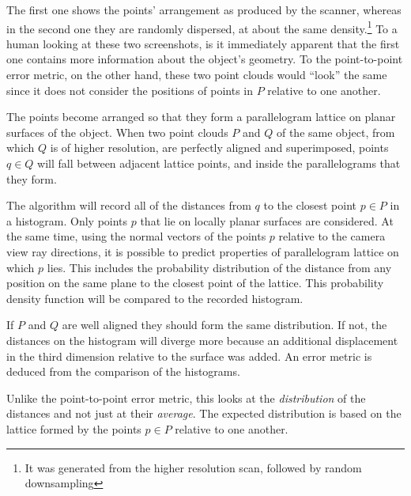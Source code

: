 The first one shows the points' arrangement as produced by the scanner, whereas in the second one they are randomly dispersed, at about the same density.\footnote{It was generated from the higher resolution scan, followed by random downsampling} To a human looking at these two screenshots, is it immediately apparent that the first one contains more information about the object's geometry. To the point-to-point error metric, on the other hand, these two point clouds would ``look'' the same since it does not consider the positions of points in $P$ relative to one another.

The points become arranged so that they form a parallelogram lattice on planar surfaces of the object. When two point clouds $P$ and $Q$ of the same object, from which $Q$ is of higher resolution, are perfectly aligned and superimposed, points $q \in Q$ will fall between adjacent lattice points, and inside the parallelograms that they form.

The algorithm will record all of the distances from $q$ to the closest point $p \in P$ in a histogram. Only points $p$ that lie on locally planar surfaces are considered. At the same time, using the normal vectors of the points $p$ relative to the camera view ray directions, it is possible to predict properties of parallelogram lattice on which $p$ lies. This includes the probability distribution of the distance from any position on the same plane to the closest point of the lattice. This probability density function will be compared to the recorded histogram.

If $P$ and $Q$ are well aligned they should form the same distribution. If not, the distances on the histogram will diverge more because an additional displacement in the third dimension relative to the surface was added. An error metric is deduced from the comparison of the histograms.

Unlike the point-to-point error metric, this looks at the \emph{distribution} of the distances and not just at their \emph{average}. The expected distribution is based on the lattice formed by the points $p \in P$ relative to one another.

